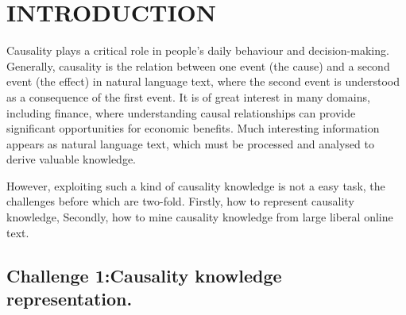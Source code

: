 \section{INTRODUCTION}
\label{sec:intro}

Causality plays a critical role in people's daily behaviour and decision-making. Generally, causality is the relation between one event (the cause) and a second event (the effect) in natural language text, where the second event is understood as a consequence of the first event. It is of great interest in many domains, including finance, where understanding causal relationships can provide significant opportunities for economic benefits. Much interesting information appears as natural language text, which must be processed and analysed to derive valuable knowledge. 

However, exploiting such a kind of causality knowledge is not a easy task, 
the challenges before which are two-fold. Firstly, how to represent causality knowledge, 
Secondly, how to mine causality knowledge from large liberal online text.


\subsection{Challenge 1:Causality knowledge representation.}
%
%


